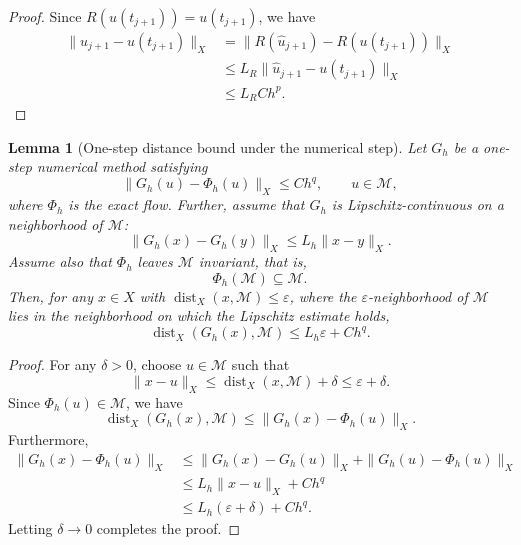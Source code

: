 \documentclass[letterpaper]{article} %
\newtheorem{lemma}{Lemma}
\begin{document}
\begin{proof}
Since $R(u(t_{j+1}))=u(t_{j+1})$, we have
\begin{equation}
\begin{split}
\|u_{j+1}-u(t_{j+1})\|_X
&=
\|R(\widehat{u}_{j+1})-R(u(t_{j+1}))\|_X \\
&\le
L_R\|\widehat{u}_{j+1}-u(t_{j+1})\|_X \\
&\le
L_R C h^p .
\end{split}
\end{equation}
\end{proof}

\begin{lemma}[One-step distance bound under the numerical step]
Let $G_h$ be a one-step numerical method satisfying
\[
\|G_h(u)-\Phi_h(u)\|_X \le Ch^{q},
\qquad u\in\mathcal{M},
\]
where $\Phi_h$ is the exact flow. Further, assume that $G_h$ is
Lipschitz-continuous on a neighborhood of $\mathcal{M}$:
\[
\|G_h(x)-G_h(y)\|_X \le L_h \|x-y\|_X.
\]
Assume also that $\Phi_h$ leaves $\mathcal{M}$ invariant, that is,
\[
\Phi_h(\mathcal{M})\subseteq\mathcal{M}.
\]
Then, for any $x\in X$ with
$\operatorname{dist}_X(x,\mathcal{M})\le \varepsilon$, where the
$\varepsilon$-neighborhood of $\mathcal{M}$ lies in the neighborhood
on which the Lipschitz estimate holds,
\[
\operatorname{dist}_X(G_h(x),\mathcal{M})
\le L_h\varepsilon+Ch^{q}.
\]
\end{lemma}

\begin{proof}
For any $\delta>0$, choose $u\in\mathcal{M}$ such that
\[
\|x-u\|_X
\le \operatorname{dist}_X(x,\mathcal{M})+\delta
\le \varepsilon+\delta.
\]
Since $\Phi_h(u)\in\mathcal{M}$, we have
\[
\operatorname{dist}_X(G_h(x),\mathcal{M})
\le \|G_h(x)-\Phi_h(u)\|_X.
\]
Furthermore,
\begin{equation}
\begin{split}
\|G_h(x)-\Phi_h(u)\|_X
&\le
\|G_h(x)-G_h(u)\|_X
+\|G_h(u)-\Phi_h(u)\|_X \\
&\le
L_h\|x-u\|_X+Ch^q \\
&\le
L_h(\varepsilon+\delta)+Ch^q.
\end{split}
\end{equation}
Letting $\delta\to0$ completes the proof.
\end{proof}
\end{document}
